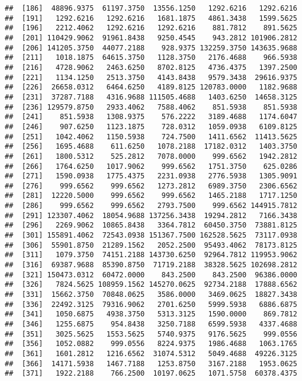 \documentclass[]{article}
\begin{document}
\begin{verbatim}
##  [186]  48896.9375  61197.3750  13556.1250   1292.6216   1292.6216
##  [191]   1292.6216   1292.6216   1681.1875   4861.3438   1599.5625
##  [196]   2212.4062   1292.6216   1292.6216    881.7812    891.5625
##  [201] 110429.9062  91961.8438   9250.4545    943.2812 101906.2812
##  [206] 141205.3750  44077.2188    928.9375 132259.3750 143635.9688
##  [211]   1018.1875  64615.3750   1128.3750   2176.4688    966.5938
##  [216]   4728.9062   2463.6250   8702.8125   4736.4375   1397.2500
##  [221]   1134.1250   2513.3750   4143.8438   9579.3438  29616.9375
##  [226]  26658.0312   6464.6250   4189.8125 120783.0000   1182.9688
##  [231]  37287.7188   4316.9688 111505.4688   1403.6250  14658.3125
##  [236] 129579.8750   2933.4062   7588.4062    851.5938    851.5938
##  [241]    851.5938   1308.9375    576.2222   3189.4688   1174.6047
##  [246]    907.6250   1123.1875    728.0312   1059.0938   6109.8125
##  [251]   1042.4062   1150.5938    724.7500   1411.6562  11413.5625
##  [256]   1695.4688    611.6250   1078.2188  17182.0312   1403.3750
##  [261]   1800.5312    525.2812   7078.0000    999.6562   1942.2812
##  [266]   1764.6250   1017.9062    999.6562   1751.3750    625.0286
##  [271]   1590.0938   1775.4375   2231.0938   2776.5938   1305.9091
##  [276]    999.6562    999.6562   1273.2812   6989.3750   2306.6562
##  [281]  12220.5000    999.6562    999.6562   1465.2188   1717.1250
##  [286]    999.6562    999.6562   2793.7500    999.6562 144915.7812
##  [291] 123307.4062  18054.9688 137256.3438  19294.2812   7166.3438
##  [296]   2269.9062  10865.8438   3364.7812  60450.3750  73881.8125
##  [301] 155891.4062  72543.0938 151367.7500 162528.5625  73117.0938
##  [306]  55901.8750  21289.1562   2052.2500  95493.4062  78173.8125
##  [311]   1079.3750  74151.2188 143730.6250  92964.7812 119953.9062
##  [316]  69387.9688  85390.8750  71719.2188  38328.5625 102698.2812
##  [321] 150473.0312  60472.0000    843.2500    843.2500  96386.0000
##  [326]   7824.5625 108959.1562 145270.0625  92734.2188  17888.6562
##  [331]  15662.3750  70848.0625   3586.0000   3469.0625  18827.3438
##  [336]  22492.3125  79316.9062   2701.6250   5999.5938   6886.6875
##  [341]   1050.6875   4938.3750   5313.3125   1590.0000    869.7812
##  [346]   1255.6875    954.8438   3250.7188   6599.5938   4337.4688
##  [351]   3025.5625   1553.5625   5740.9375   9176.5625    999.0556
##  [356]   1052.0882    999.0556   8224.9375   1986.4688   1063.1765
##  [361]   1601.2812   1216.6562  31074.5312   5049.4688  49226.3125
##  [366]  14171.5938   1467.7188   1253.8750   3167.2188   1953.0625
##  [371]   1922.2188    766.2500  10197.0625   1071.5758  60378.4375

\end{verbatim}
\end{document}

